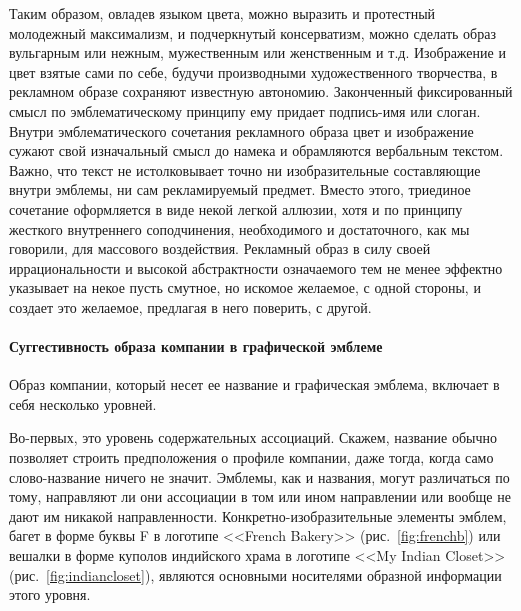 Таким образом, овладев языком цвета, можно выразить и протестный молодежный
максимализм, и подчеркнутый консерватизм, можно сделать образ вульгарным или
нежным, мужественным или женственным и т.д. Изображение и цвет взятые сами по
себе, будучи производными художественного творчества, в рекламном образе
сохраняют известную автономию. Законченный фиксированный смысл по эмблематическому
принципу ему придает подпись-имя или слоган. Внутри эмблематического сочетания
рекламного образа цвет и изображение сужают свой изначальный смысл до намека и
обрамляются вербальным текстом. Важно, что текст не истолковывает точно ни
изобразительные составляющие внутри эмблемы, ни сам рекламируемый предмет.
Вместо этого, триединое сочетание оформляется в виде некой легкой аллюзии, хотя
и по принципу жесткого внутреннего соподчинения, необходимого и достаточного,
как мы говорили, для массового воздействия. Рекламный образ в силу своей
иррациональности и высокой абстрактности означаемого тем не менее эффектно
указывает на некое пусть смутное, но искомое желаемое, с одной стороны, и
создает это желаемое, предлагая в него поверить, с другой.

\paragraph{Суггестивность образа компании в  графической эмблеме}

Образ компании, который несет ее название и графическая эмблема, включает в
себя несколько уровней.

Во-первых, это уровень содержательных ассоциаций. Скажем, название обычно
позволяет строить предположения о профиле компании, даже тогда, когда само
слово-название ничего не значит. Эмблемы, как и названия, могут различаться по
тому, направляют ли они ассоциации в том или ином направлении или вообще не
дают им никакой направленности. Конкретно-изобразительные элементы эмблем,
багет в форме буквы F в логотипе <<French Bakery>> (рис.~\ref{fig:frenchb}) или вешалки в форме куполов
индийского храма в логотипе <<My Indian Closet>>(рис.~\ref{fig:indiancloset}), являются основными носителями
образной информации этого уровня.

